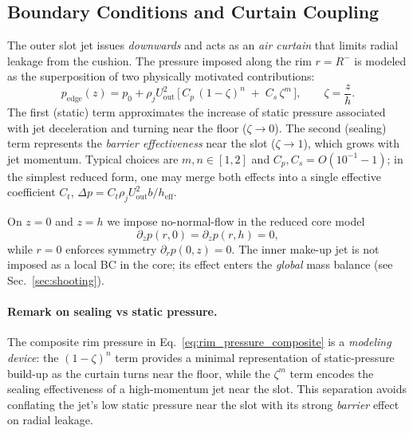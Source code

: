 \documentclass[11pt,a4paper]{article}
\begin{document}
\subsection{Boundary Conditions and Curtain Coupling}
The outer slot jet issues \emph{downwards} and acts as an \emph{air curtain} that
limits radial leakage from the cushion. The pressure imposed along the rim
$r=R^{-}$ is modeled as the superposition of two physically motivated
contributions:
\begin{equation}
  p_{\mathrm{edge}}(z)
  = p_0 + \rho_j U_{\mathrm{out}}^2\,
    \big[\, C_p\, (1-\zeta)^{n} \;+\; C_s\, \zeta^{m} \,\big],
  \qquad \zeta=\frac{z}{h}.
  \label{eq:rim_pressure_composite}
\end{equation}
The first (static) term approximates the increase of static pressure associated with
jet deceleration and turning near the floor ($\zeta\!\to\!0$). The second (sealing)
term represents the \emph{barrier effectiveness} near the slot ($\zeta\!\to\!1$),
which grows with jet momentum. Typical choices are $m,n\in[1,2]$ and
$C_p,C_s=O(10^{-1}\!\!-\!1)$; in the simplest reduced form, one may merge both
effects into a single effective coefficient $C_t$,
$\Delta p = C_t \rho_j U_{\mathrm{out}}^2 b / h_{\mathrm{eff}}$.

On $z=0$ and $z=h$ we impose no-normal-flow in the reduced core model
\begin{equation}
  \partial_z p(r,0)=\partial_z p(r,h)=0,
\end{equation}
while $r=0$ enforces symmetry $\partial_r p(0,z)=0$. The inner make-up jet is not
imposed as a local BC in the core; its effect enters the \emph{global} mass balance
(see Sec.~\ref{sec:shooting}).

\paragraph{Remark on sealing vs static pressure.}
The composite rim pressure in Eq.~\eqref{eq:rim_pressure_composite} is a
\emph{modeling device}: the $(1-\zeta)^n$ term provides a minimal representation
of static-pressure build-up as the curtain turns near the floor, while the
$\zeta^m$ term encodes the sealing effectiveness of a high-momentum jet near the slot.
This separation avoids conflating the jet’s low static pressure near the slot with
its strong \emph{barrier} effect on radial leakage.
\end{document}
